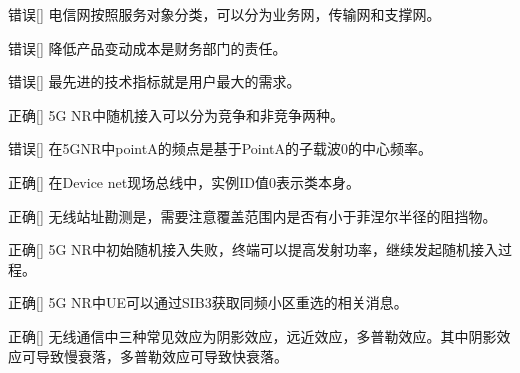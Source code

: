 \begin{choice}{\;错误\;}[]
    电信网按照服务对象分类，可以分为业务网，传输网和支撑网。

\end{choice}


\begin{choice}{\;错误\;}[]
    降低产品变动成本是财务部门的责任。

\end{choice}

\begin{choice}{\;错误\;}[]
    最先进的技术指标就是用户最大的需求。

\end{choice}


\begin{choice}{\;正确\;}[]
    5G NR中随机接入可以分为竞争和非竞争两种。

\end{choice}


\begin{choice}{\;错误\;}[]
    在5G\;NR中pointA的频点是基于PointA的子载波0的中心频率。

\end{choice}


\begin{choice}{\;正确\;}[]
    在Device net现场总线中，实例ID值0表示类本身。

\end{choice}


\begin{choice}{\;正确\;}[]
    无线站址勘测是，需要注意覆盖范围内是否有小于菲涅尔半径的阻挡物。

\end{choice}


\begin{choice}{\;正确\;}[]
    5G NR中初始随机接入失败，终端可以提高发射功率，继续发起随机接入过程。

\end{choice}


\begin{choice}{\;正确\;}[]
    5G NR中UE可以通过SIB3获取同频小区重选的相关消息。

\end{choice}


\begin{choice}{\;正确\;}[]
    无线通信中三种常见效应为阴影效应，远近效应，多普勒效应。其中阴影效应可导致慢衰落，多普勒效应可导致快衰落。

\end{choice}

